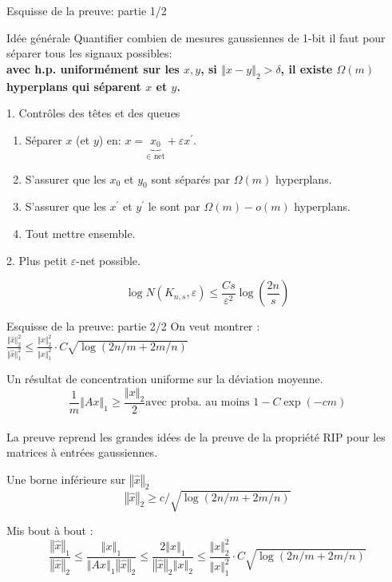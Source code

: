 \documentclass[10pt, aspectratio=169]{beamer}
\newcommand{\norm}[1]{\left\Vert #1 \right\Vert}
\begin{document}
\begin{frame}{Esquisse de la preuve: partie 1/2}
\begin{block}{Idée générale}
\smallskip
\centering
Quantifier combien de mesures gaussiennes de 1-bit il faut pour séparer tous les signaux possibles:\\

\textbf{avec h.p. uniformément sur les $x,y$, si $\norm{x-y}_2 > \delta$, il existe $\Omega(m)$ hyperplans qui séparent $x$ et $y$.}
\end{block}
\begin{block}{1. Contrôles des têtes et des queues}
\smallskip
\begin{enumerate}
    \item Séparer $x$ (et $y$) en: $x=\underbrace{x_0}_\text{$\in$ net}+ \varepsilon x^\prime$.
    \item S'assurer que les $x_0$ et $y_0$ sont séparés par $\Omega(m)$ hyperplans.
    \item S'assurer que les $x^\prime$ et $y^\prime$ le sont par $\Omega(m) - o(m)$ hyperplans.
    \item Tout mettre ensemble.
\end{enumerate}
\end{block}
\begin{block}{2. Plus petit $\varepsilon$-net possible.}

$$ \log N(K_{n,s}, \varepsilon) \leq \frac{Cs}{\varepsilon^2} \log \left(\frac{2n}{s}\right)$$
\end{block}
 
\end{frame}
\begin{frame}{Esquisse de la preuve: partie 2/2}
\smallskip
On veut montrer : $\frac{\Vert \hat{x}\Vert_2^2}{\Vert \hat{x}\Vert_1^2} \leq  \frac{\Vert {x}\Vert_2^2}{\Vert {x}\Vert_1^2} \cdot C \sqrt{\log(2n/m + 2m/n)}  $

\begin{block}{Un résultat de concentration uniforme sur la déviation moyenne.}
$$\frac{1}{m} \norm{Ax}_1 \geq \frac{\norm{x}_2}{2} \text{avec proba. au moins } 1-C \exp(-cm) $$\\
La preuve reprend les grandes idées de la preuve de la propriété RIP pour les matrices à entrées gaussiennes.
\end{block}
\begin{block}{Une borne inférieure sur $\norm{\hat{x}}_2$}
$$ \norm{\hat{x}}_2 \geq c/ \sqrt{\log(2n/m + 2m/n)}$$
\end{block}
Mis bout à bout :
$$\frac{\norm{\hat{x}}_1}{\norm{\hat{x}}_2} \leq \frac{\norm{x}_1}{\norm{Ax}_1 \norm{\hat{x}}_2} \leq  \frac{2\norm{x}_1}{\norm{\hat{x}}_2 \norm{x}_2} \leq \frac{\Vert {x}\Vert_2^2}{\Vert {x}\Vert_1^2} \cdot C \sqrt{\log(2n/m + 2m/n)} $$
\begin{block}{}

\end{block}
\end{frame}
\end{document}
